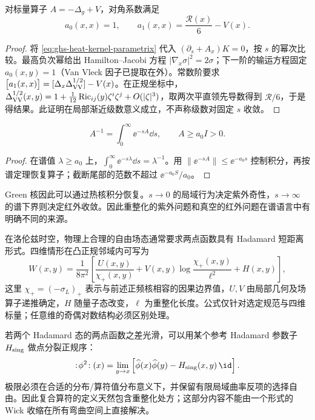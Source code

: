 \begin{proposition}[第一项局域热核系数]
\label{prop:ghs-heat-kernel-first}
对标量算子 $A=-\Delta_g+V$，对角系数满足
\begin{equation}\label{eq:ghs-first-heat-coefficient}
 a_0(x,x)=1,\qquad a_1(x,x)=\frac{\mathcal R(x)}6-V(x).
\end{equation}
\end{proposition}
\begin{proof}
将 \cref{eq:ghs-heat-kernel-parametrix} 代入 $(\partial_s+A_x)K=0$，按 $s$ 的幂次比较。最高负次幂给出 Hamilton--Jacobi 方程 $|\nabla_x\sigma|^2=2\sigma$；下一阶的输运方程固定 $a_0(x,y)=1$（Van Vleck 因子已提取在外）。常数阶要求
$\bigl[a_1(x,x)\bigr]=[\Delta_x\Delta_{\rm VV}^{1/2}]-V(x)$。在正规坐标中，$\Delta_{\rm VV}^{1/2}(x,y)=1+\frac1{12}\operatorname{Ric}_{ij}(y)\zeta^i\zeta^j+O(|\zeta|^3)$，取两次平直领先导数得到 $\mathcal R/6$，于是得结果。此证明在局部渐近级数意义成立，不声称级数对固定 $s$ 收敛。
\end{proof}

\begin{proposition}[由正谱热核恢复逆算子]
\begin{equation}\label{eq:ghs-heat-green-laplace}
 A^{-1}=\int_0^\infty\ee^{-sA}\dd s,\qquad A\ge a_0 I>0.
\end{equation}
\end{proposition}
\begin{proof}
在谱值 $\lambda\ge a_0$ 上，$\int_0^\infty\ee^{-s\lambda}\dd s=\lambda^{-1}$。用 $\|\ee^{-sA}\|\le\ee^{-a_0s}$ 控制积分，再按谱定理恢复算子；截断尾部的范数不超过 $\ee^{-a_0S}/a_0$。
\end{proof}
Green 核因此可以通过热核积分恢复。$s\to0$ 的局域行为决定紫外奇性，$s\to\infty$ 的谱下界则决定红外收敛。因此重整化的紫外问题和真空的红外问题在谱语言中有明确不同的来源。


在洛伦兹时空，物理上合理的自由场态通常要求两点函数具有 Hadamard 短距离形式。四维情形在凸正规邻域内可写为
\begin{equation}\label{eq:ghs-hadamard-four-dimensional}
 W(x,y)=\frac1{8\pi^2}\left[
 \frac{U(x,y)}{\chi_+(x,y)}+V(x,y)\log\frac{\chi_+(x,y)}{\ell^2}
 +H(x,y)\right],
\end{equation}
这里 $\chi_+=(-\sigma_L)_+$ 表示与前述正频核相容的因果边界值，$U,V$ 由局部几何及场算子递推确定，$H$ 随量子态改变，$\ell$ 为重整化长度。公式仅针对选定规范与四维标量；任意维的奇偶对数结构必须区别处理。

若两个 Hadamard 态的两点函数之差光滑，可以用某个参考 Hadamard 参数子 $H_{\rm sing}$ 做点分裂正规序：
\[
 :\!\phi^2\!:(x)=\lim_{y\to x}\left[\widehat\phi(x)\widehat\phi(y)-H_{\rm sing}(x,y)\,\id\right].
\]
极限必须在合适的分布/算符值分布意义下，并保留有限局域曲率反项的选择自由。因此复合算符的定义天然包含重整化处方；这部分内容不能由一个形式的 Wick 收缩在所有弯曲空间上直接解决。



